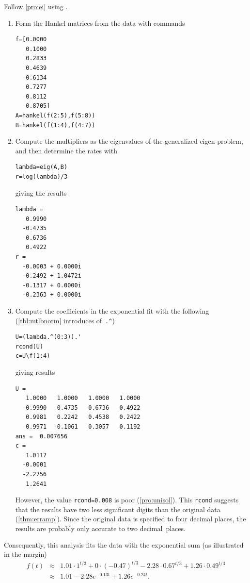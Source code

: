 \begin{reduce}
\begin{example}
\begin{solution} 
Follow \autoref{pro:ei} using \script. 
\begin{enumerate}
\item Form the Hankel matrices from the data with commands
\begin{verbatim}
f=[0.0000
   0.1000
   0.2833
   0.4639
   0.6134
   0.7277
   0.8112
   0.8705]
A=hankel(f(2:5),f(5:8))
B=hankel(f(1:4),f(4:7))
\end{verbatim}
\setbox\ajrqrbox\hbox{}%
\marginajrbox%

\item Compute the multipliers as the eigenvalues of the generalized eigen-problem, and then determine the rates with
\begin{verbatim}
lambda=eig(A,B)
r=log(lambda)/3
\end{verbatim}
giving the results
\begin{verbatim}
lambda =
   0.9990
  -0.4735
   0.6736
   0.4922
r =
  -0.0003 + 0.0000i
  -0.2492 + 1.0472i
  -0.1317 + 0.0000i
  -0.2363 + 0.0000i
\end{verbatim}

\item Compute the coefficients in the exponential fit with the following (\autoref{tbl:mtlbnorm} introduces  of~\verb|.^|)
\begin{verbatim}
U=(lambda.^(0:3)).'
rcond(U)
c=U\f(1:4)
\end{verbatim}
giving results
\begin{verbatim}
U =
   1.0000   1.0000   1.0000   1.0000
   0.9990  -0.4735   0.6736   0.4922
   0.9981   0.2242   0.4538   0.2422
   0.9971  -0.1061   0.3057   0.1192
ans =  0.007656
c =
   1.0117
  -0.0001
  -2.2756
   1.2641
\end{verbatim}
However, the value \verb|rcond=0.008| is poor (\autoref{pro:unisol}).
This \verb|rcond| suggests that the results have two less significant digits than the original data (\autoref{thm:erramp}).
Since the original data is specified to four decimal places, the results are probably only accurate to two decimal~places.
\end{enumerate}
Consequently, this analysis fits the data with the exponential sum (as illustrated in the margin)
%
\begin{eqnarray*}
f(t)&\approx&1.01\cdot1^{t/3}+0\cdot(-0.47)^{t/3}
-2.28\cdot0.67^{t/3}+1.26\cdot0.49^{t/3}
\\&\approx&1.01-2.28e^{-0.13t}+1.26e^{-0.24t}.
\end{eqnarray*}
\end{solution}
\end{example}



\end{reduce}
